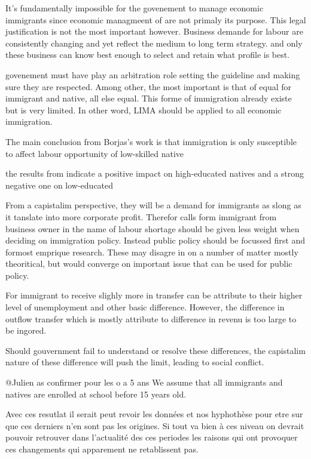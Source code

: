 It's fundamentally impossible for the govenement to manage economic immigrants since economic managmeent of are not primaly its purpose. This legal justification is not the most important however. Business demande for labour are consistently changing and yet reflect the medium to long term strategy. and only these business can know best enough to select and retain what profile is best.

govenement must have play an arbitration role setting the guideline and making sure they are respected. Among other, the most important is that of equal for immigrant and native, all else equal. This forme of immigration already existe but is very limited. In other word, LIMA should be applied to all economic immigration.



The main conclusion from Borjas's work is that immigration is only susceptible to affect labour opportunity of low-skilled native\citep{Piche:2013ir}

the results from \citet{Fusaro:2018wi} indicate a positive impact on high-educated natives and a strong negative one on low-educated



From a capistalim perspective, they will be a demand for immigrants as slong as it tanslate into more corporate profit. Therefor calls form immigrant from business owner in the name of labour shortage should be given less weight when deciding on immigration policy. Instead public policy should be focussed first and formost emprique research. These may disagre in on a number of matter mostly theoritical, but would converge on important issue that can be used for public policy.

For immigrant to receive slighly more in transfer can be attribute to their higher level of unemployment and other basic difference. However, the difference in outflow transfer which is mostly attribute to difference in revenu is too large to be ingored.

Should gouvernment fail to understand or resolve these differences, the capistalim nature of these difference will push the limit, leading to social conflict.





@Julien
as confirmer pour les o a 5 ans
We assume that all immigrants and natives are enrolled at school before 15 years old.

Avec ces resutlat il serait peut revoir les données et nos hyphothèse pour etre sur que ces derniers n'en sont pas les origines. Si tout va bien à ces niveau on devrait pouvoir retrouver dans l'actualité des ces periodes les raisons qui ont provoquer ces changements qui apparement ne retablissent pas.

